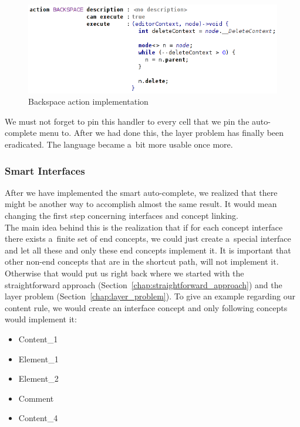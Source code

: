 \begin{figure}[ht]
	\centering
	\includegraphics[width=\textwidth]{./img/backspace_action.png}
	\caption{Backspace action implementation}
	\label{fig:backspace_action}
\end{figure}

We must not forget to pin this handler to every cell that we pin the auto-complete menu to.
After we had done this, the layer problem has finally been eradicated.
The language became a~bit more usable once more.

\subsubsection{Smart Interfaces}

After we have implemented the smart auto-complete, we realized that there might be another way to accomplish almost the same result.
It would mean changing the first step concerning interfaces and concept linking.
\\

The main idea behind this is the realization that if for each concept interface there exists a~finite set of end concepts, we could just create a~special interface and let all these and only these end concepts implement it.
It is important that other non-end concepts that are in the shortcut path, will not implement it.
Otherwise that would put us right back where we started with the straightforward approach (Section~\ref{chap:straightforward_approach}) and the layer problem (Section~\ref{chap:layer_problem}).
To give an example regarding our content rule, we would create an  interface concept and only following concepts would implement it:

\begin{itemize}
	\itemsep0em
	\item Content{\_}1
	\item Element{\_}1
	\item Element{\_}2
	\item Comment
	\item Content{\_}4
\end{itemize}


